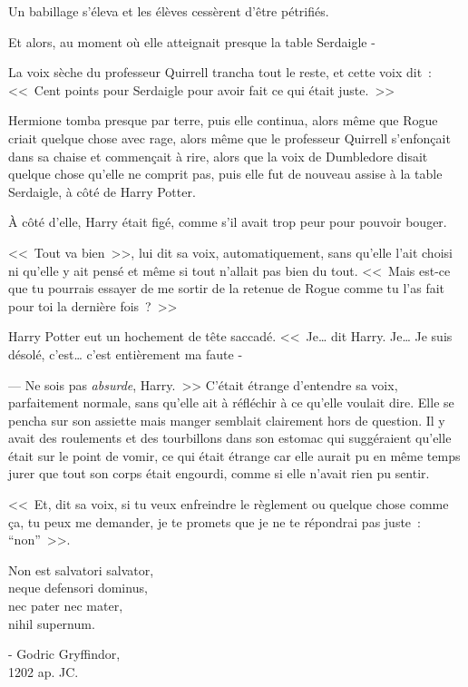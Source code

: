 Un babillage s'éleva et les élèves cessèrent d'être pétrifiés.

Et alors, au moment où elle atteignait presque la table Serdaigle -

La voix sèche du professeur Quirrell trancha tout le reste, et cette voix dit~: <<~Cent points pour Serdaigle pour avoir fait ce qui était juste.~>>

Hermione tomba presque par terre, puis elle continua, alors même que Rogue criait quelque chose avec rage, alors même que le professeur Quirrell s'enfonçait dans sa chaise et commençait à rire, alors que la voix de Dumbledore disait quelque chose qu'elle ne comprit pas, puis elle fut de nouveau assise à la table Serdaigle, à côté de Harry Potter.

À côté d'elle, Harry était figé, comme s'il avait trop peur pour pouvoir bouger.

<<~Tout va bien~>>, lui dit sa voix, automatiquement, sans qu'elle l'ait choisi ni qu'elle y ait pensé et même si tout n'allait pas bien du tout. <<~Mais est-ce que tu pourrais essayer de me sortir de la retenue de Rogue comme tu l'as fait pour toi la dernière fois~?~>>

Harry Potter eut un hochement de tête saccadé. <<~Je… dit Harry. Je… Je suis désolé, c'est… c'est entièrement ma faute -

--- Ne sois pas \emph{absurde}, Harry.~>> C'était étrange d'entendre sa voix, parfaitement normale, sans qu'elle ait à réfléchir à ce qu'elle voulait dire. Elle se pencha sur son assiette mais manger semblait clairement hors de question. Il y avait des roulements et des tourbillons dans son estomac qui suggéraient qu'elle était sur le point de vomir, ce qui était étrange car elle aurait pu en même temps jurer que tout son corps était engourdi, comme si elle n'avait rien pu sentir.

<<~Et, dit sa voix, si tu veux enfreindre le règlement ou quelque chose comme ça, tu peux me demander, je te promets que je ne te répondrai pas juste~: “non”~>>.
\later

\begin{center}
Non est salvatori salvator,\\
neque defensori dominus,\\
nec pater nec mater,\\
nihil supernum.

- Godric Gryffindor,\\
1202 ap. JC. 
\end{center}

